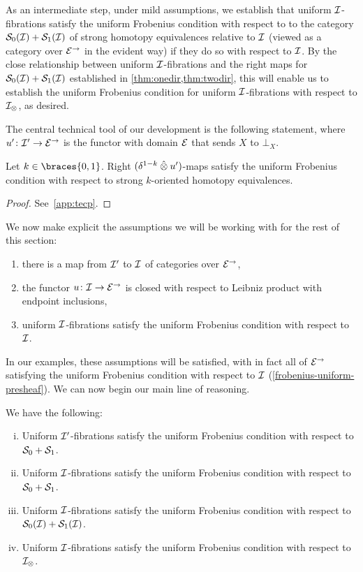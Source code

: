 \documentclass[reqno,10pt,a4paper,oneside,draft]{amsart}
\begin{document}
As an intermediate step, under mild assumptions, we establish that uniform $\cal{I}$-fibrations satisfy the uniform Frobenius condition with respect to to the category $\cal{S}_0(\cal{I}) + \cal{S}_1(\cal{I})$ of strong homotopy equivalences relative to $\cal{I}$ (viewed as a category over $\cal{E}^\to$ in the evident way) if they do so with respect to $\cal{I}$.
By the close relationship between uniform $\cal{I}$-fibrations and the right maps for $\cal{S}_0(\cal{I}) + \cal{S}_1(\cal{I})$ established in \cref{thm:onedir,thm:twodir}, this will enable us to establish the uniform Frobenius condition for uniform $\cal{I}$-fibrations with respect to $\cal{I}_\otimes$, as desired.


The central technical tool of our development is the following statement, where
$u' \co \cal{I}' \to \cal{E}^\to$ is the functor with domain $\cal{E}$ that sends $X$ to $\bot_X$.

\begin{lemma} \label{technical}
Let $k \in \braces{0, 1}$.
Right $(\delta^{1-k} \hatotimes u')$-maps satisfy the uniform Frobenius condition with respect to strong $k$-oriented homotopy equivalences.
\end{lemma}

\begin{proof}
See~\cref{app:tecp}.
\end{proof}

We now make explicit the assumptions we will be working with for the rest of this section:
\begin{enumerate}[(1)]
\item 
there is a map from $\cal{I}'$ to $\cal{I}$ of categories over $\cal{E}^\to$,
\item
the functor $u \co \cal{I} \to \catE^\to$ is closed with respect to Leibniz product with endpoint inclusions,
\item
uniform $\cal{I}$-fibrations satisfy the uniform Frobenius condition with respect to $\cal{I}$.
\end{enumerate}
In our examples, these assumptions will be satisfied, with in fact all of $\catE^\to$ satisfying the uniform Frobenius condition with respect to $\cal{I}$ (\cref{frobenius-uniform-presheaf}).
We can now begin our main line of reasoning.

\begin{proposition}
We have the following:
\begin{enumerate}[(i)]
\item 
Uniform $\cal{I}'$-fibrations satisfy the uniform Frobenius condition with respect to $\cal{S}_0 + \cal{S}_1$.
\item
Uniform $\cal{I}$-fibrations satisfy the uniform Frobenius condition with respect to $\cal{S}_0 + \cal{S}_1$.
\item
Uniform $\cal{I}$-fibrations satisfy the uniform Frobenius condition with respect to $\cal{S}_0(\cal{I}) + \cal{S}_1(\cal{I})$.
\item
Uniform $\cal{I}$-fibrations satisfy the uniform Frobenius condition with respect to $\cal{I}_\otimes$.
\end{enumerate}
\end{proposition}
\end{document}
